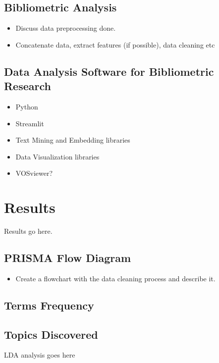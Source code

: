 \documentclass[parskip=full]{scrartcl}
\begin{document}
\subsection{Bibliometric Analysis}

\begin{itemize}
    \item Discuss data preprocessing done.
    \item Concatenate data, extract features (if possible), data cleaning etc
\end{itemize}

\subsection{Data Analysis Software for Bibliometric Research}

\begin{itemize}
    \item Python
    \item Streamlit
    \item Text Mining and Embedding libraries
    \item Data Visualization libraries
    \item VOSviewer?
\end{itemize}

\section{Results}

Results go here.

\subsection{PRISMA Flow Diagram}

\begin{itemize}
    \item Create a flowchart with the data cleaning process and describe it.
\end{itemize}

\subsection{Terms Frequency}

\subsection{Topics Discovered}

LDA analysis goes here
\end{document}
